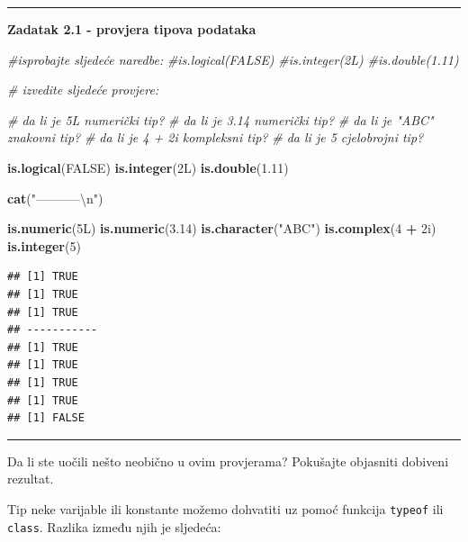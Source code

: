 \documentclass[]{book}
\newenvironment{Shaded}{\begin{snugshade}}{\end{snugshade}}
\newcommand{\KeywordTok}[1]{\textcolor[rgb]{0.13,0.29,0.53}{\textbf{#1}}}
\newcommand{\DecValTok}[1]{\textcolor[rgb]{0.00,0.00,0.81}{#1}}
\newcommand{\FloatTok}[1]{\textcolor[rgb]{0.00,0.00,0.81}{#1}}
\newcommand{\CharTok}[1]{\textcolor[rgb]{0.31,0.60,0.02}{#1}}
\newcommand{\StringTok}[1]{\textcolor[rgb]{0.31,0.60,0.02}{#1}}
\newcommand{\CommentTok}[1]{\textcolor[rgb]{0.56,0.35,0.01}{\textit{#1}}}
\newcommand{\OtherTok}[1]{\textcolor[rgb]{0.56,0.35,0.01}{#1}}
\newcommand{\OperatorTok}[1]{\textcolor[rgb]{0.81,0.36,0.00}{\textbf{#1}}}
\newcommand{\NormalTok}[1]{#1}
\theoremstyle{definition}
\theoremstyle{definition}
\theoremstyle{definition}
\theoremstyle{remark}
\begin{document}
\begin{center}\rule{0.5\linewidth}{\linethickness}\end{center}

\textbf{Zadatak 2.1 - provjera tipova podataka}

\begin{Shaded}
\begin{Highlighting}[]
\CommentTok{#isprobajte sljedeće naredbe:}
\CommentTok{#is.logical(FALSE)}
\CommentTok{#is.integer(2L)}
\CommentTok{#is.double(1.11)}

\CommentTok{# izvedite sljedeće provjere:}

\CommentTok{# da li je 5L numerički tip?}
\CommentTok{# da li je 3.14 numerički tip?}
\CommentTok{# da li je "ABC" znakovni tip?}
\CommentTok{# da li je 4 + 2i kompleksni tip?}
\CommentTok{# da li je 5 cjelobrojni tip?}
\end{Highlighting}
\end{Shaded}

\begin{Shaded}
\begin{Highlighting}[]
\KeywordTok{is.logical}\NormalTok{(}\OtherTok{FALSE}\NormalTok{)}
\KeywordTok{is.integer}\NormalTok{(2L)}
\KeywordTok{is.double}\NormalTok{(}\FloatTok{1.11}\NormalTok{)}

\KeywordTok{cat}\NormalTok{(}\StringTok{"-----------}\CharTok{\textbackslash{}n}\StringTok{"}\NormalTok{)}

\KeywordTok{is.numeric}\NormalTok{(5L)}
\KeywordTok{is.numeric}\NormalTok{(}\FloatTok{3.14}\NormalTok{)}
\KeywordTok{is.character}\NormalTok{(}\StringTok{"ABC"}\NormalTok{)}
\KeywordTok{is.complex}\NormalTok{(}\DecValTok{4} \OperatorTok{+}\StringTok{ }\NormalTok{2i)}
\KeywordTok{is.integer}\NormalTok{(}\DecValTok{5}\NormalTok{)}
\end{Highlighting}
\end{Shaded}

\begin{verbatim}
## [1] TRUE
## [1] TRUE
## [1] TRUE
## -----------
## [1] TRUE
## [1] TRUE
## [1] TRUE
## [1] TRUE
## [1] FALSE
\end{verbatim}

\begin{center}\rule{0.5\linewidth}{\linethickness}\end{center}

Da li ste uočili nešto neobično u ovim provjerama? Pokušajte objasniti
dobiveni rezultat.

Tip neke varijable ili konstante možemo dohvatiti uz pomoć funkcija
\texttt{typeof} ili \texttt{class}. Razlika između njih je sljedeća:
\end{document}
